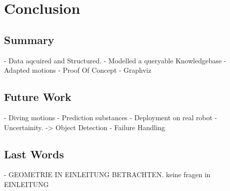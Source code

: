 \chapter{Conclusion}
\label{chap:conclusion}

\section{Summary}
- Data aqcuired and Structured.
- Modelled a queryable Knowledgebase
- Adapted motions
- Proof Of Concept
- Graphviz
\section{Future Work}
- Diving motions
- Prediction substances
- Deployment on real robot
- Uncertainity. -> Object Detection
- Failure Handling

\section{Last Words}

- GEOMETRIE IN EINLEITUNG BETRACHTEN.
keine fragen in EINLEITUNG